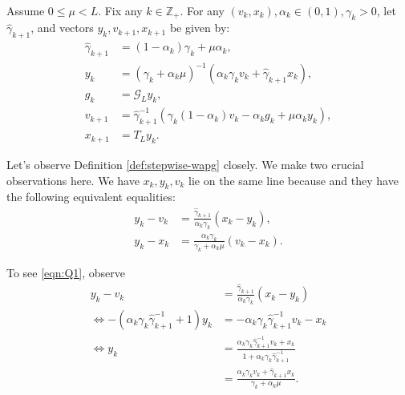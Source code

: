 \documentclass[12pt]{article}
\begin{document}
    \begin{definition}\label{def:stepwise-wapg}\;\\
        Assume $0 \le \mu < L$.
        Fix any $k \in \mathbb Z_+$. 
        For any $(v_k, x_k), \alpha_k \in (0, 1), \gamma_k > 0$, let $\hat \gamma_{k + 1}$, and vectors $y_k, v_{k + 1}, x_{k + 1}$ be given by: 
        \begin{align}
            \hat \gamma_{k + 1} &= (1 - \alpha_k)\gamma_k + \mu \alpha_k, \label{eqn:stepwise-wapg-eqn1}
            \\
            y_k &= 
            (\gamma_k + \alpha_k \mu)^{-1}(\alpha_k \gamma_k v_k + \hat\gamma_{k + 1} x_k), \label{eqn:stepwise-wapg-eqn2}
            \\
            g_k &= \mathcal G_L y_k, \label{eqn:stepwise-wapg-eqn3}
            \\
            v_{k + 1} &= \hat\gamma^{-1}_{k + 1}
            (\gamma_k(1 - \alpha_k) v_k - \alpha_k g_k + \mu \alpha_k y_k), \label{eqn:stepwise-wapg-eqn4}
            \\
            x_{k + 1} &= T_L y_k. \label{eqn:stepwise-wapg-eqn5}
        \end{align}
    \end{definition}
    \begin{observation}\label{obs:stepwise-wapg}
        Let's observe Definition \ref{def:stepwise-wapg} closely. 
        We make two crucial observations here. 
        We have $x_k, y_k, v_k$ lie on the same line because and they have the following equivalent equalities: 
        \begin{align*}
            y_k - v_k &= 
            \frac{\hat \gamma_{k + 1}}{\alpha_k \gamma_k}(x_k - y_k), 
            \tag{Q1}\label{eqn:Q1}
            \\
            y_k - x_k &= 
            \frac{\alpha_k \gamma_k}{\gamma_k + \alpha_k \mu}(v_k - x_k). 
            \tag{Q2}\label{eqn:Q2}
        \end{align*}
    \end{observation}
        To see \eqref{eqn:Q1}, observe 
        \begin{align*}
            y_k - v_k &= 
            \frac{\hat \gamma_{k + 1}}{\alpha_k \gamma_k}(x_k - y_k)
            \\
            \iff 
            -(\alpha_k \gamma_k \hat \gamma^{-1}_{k + 1} + 1)y_k
            &= 
            - \alpha_k \gamma_k \hat \gamma^{-1}_{k + 1}v_k - x_k
            \\
            \iff 
            y_k &= 
            \frac{
                \alpha_k \gamma_k \hat \gamma_{k + 1}^{-1}v_k + x_k
            }{1 + \alpha_k \gamma_k \hat \gamma_{k + 1}^{-1}}
            \\
            &=  
            \frac{\alpha_k \gamma_k v_k + \hat \gamma_{k + 1} x_k}{\gamma_k + \alpha_k \mu}.
        \end{align*}
\end{document}

